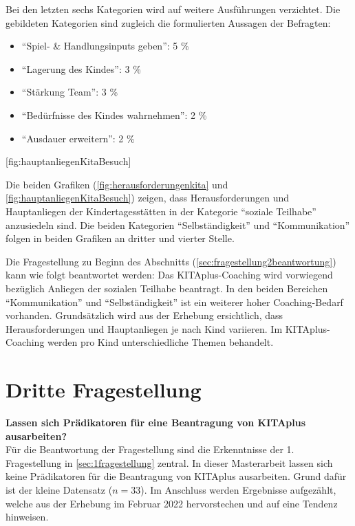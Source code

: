 \documentclass[
  ngerman,
  11pt,
  paper=a4,
  twoside,
  titlepage=true,
  openright,
  abstract=on,
  toc=listofnumbered,
  numbers=noenddot,
  chapterprefix=true,
  headings=optiontohead,
  svgnames,
  dvipsnames]{scrreprt}
\providecommand{\tightlist}{%
  \setlength{\itemsep}{0pt}\setlength{\parskip}{0pt}}
\begin{document}
Bei den letzten sechs Kategorien wird auf weitere Ausführungen
verzichtet. Die gebildeten Kategorien sind zugleich die formulierten
Aussagen der Befragten:

\begin{itemize}
\tightlist
\item
  “Spiel- \& Handlungsinputs geben”: 5 \%
\item
  “Lagerung des Kindes”: 3 \%
\item
  “Stärkung Team”: 3 \%
\item
  “Bedürfnisse des Kindes wahrnehmen”: 2 \%
\item
  “Ausdauer erweitern”: 2 \%
\end{itemize}

[fig:hauptanliegenKitaBesuch]

Die beiden Grafiken (\cref{fig:herausforderungenkita} und
\cref{fig:hauptanliegenKitaBesuch}) zeigen, dass Herausforderungen und
Hauptanliegen der Kindertagesstätten in der Kategorie “soziale Teilhabe”
anzusiedeln sind. Die beiden Kategorien “Selbständigkeit” und
“Kommunikation” folgen in beiden Grafiken an dritter und vierter Stelle.

Die Fragestellung zu Beginn des Abschnitts
(\cref{sec:fragestellung2beantwortung}) kann wie folgt beantwortet
werden: Das KITAplus-Coaching wird vorwiegend bezüglich Anliegen der
sozialen Teilhabe beantragt. In den beiden Bereichen “Kommunikation” und
“Selbständigkeit” ist ein weiterer hoher Coaching-Bedarf vorhanden.
Grundsätzlich wird aus der Erhebung ersichtlich, dass Herausforderungen
und Hauptanliegen je nach Kind variieren. Im KITAplus-Coaching werden
pro Kind unterschiedliche Themen behandelt.

\hypertarget{sec:fragestellung3beantwortung}{%
\section{Dritte Fragestellung}\label{sec:fragestellung3beantwortung}}

\textbf{Lassen sich Prädikatoren für eine Beantragung von KITAplus
ausarbeiten?}\\
Für die Beantwortung der Fragestellung sind die Erkenntnisse der 1.
Fragestellung in \cref{sec:1fragestellung} zentral. In dieser
Masterarbeit lassen sich keine Prädikatoren für die Beantragung von
KITAplus ausarbeiten. Grund dafür ist der kleine Datensatz (\(n=33\)).
Im Anschluss werden Ergebnisse aufgezählt, welche aus der Erhebung im
Februar 2022 hervorstechen und auf eine Tendenz hinweisen.
\end{document}
